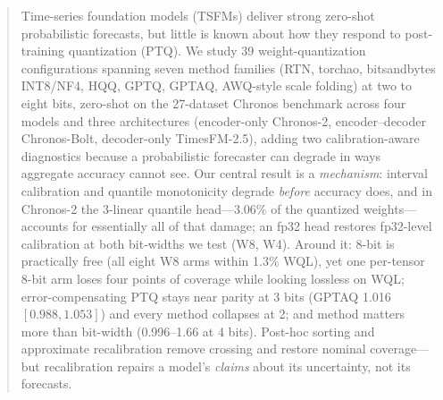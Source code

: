 \documentclass{article}
\begin{document}

\printAffiliationsAndNotice{}

\raggedbottom

\begin{abstract}
Time-series foundation models (TSFMs) deliver strong zero-shot probabilistic forecasts,
but little is known about how they respond to post-training quantization (PTQ). We study
39 weight-quantization configurations spanning seven method families (RTN, torchao,
bitsandbytes INT8/NF4, HQQ, GPTQ, GPTAQ, AWQ-style scale folding) at two to eight bits,
zero-shot on the 27-dataset Chronos benchmark across four models and three architectures
(encoder-only Chronos-2, encoder--decoder Chronos-Bolt, decoder-only TimesFM-2.5), adding
two calibration-aware diagnostics because a probabilistic forecaster can degrade in ways
aggregate accuracy cannot see. Our central result is a \emph{mechanism}: interval
calibration and quantile monotonicity degrade \emph{before} accuracy does, and in
Chronos-2 the 3-linear quantile head---3.06\% of the quantized weights---accounts for
essentially all of that damage; an fp32 head restores fp32-level calibration at both
bit-widths we test (W8, W4). Around it: 8-bit is practically free (all eight W8 arms
within 1.3\% WQL), yet one per-tensor 8-bit arm loses four points of coverage while
looking lossless on WQL; error-compensating PTQ stays near parity at 3 bits (GPTAQ 1.016
$[0.988,1.053]$) and every method collapses at 2; and method matters more than bit-width
(0.996--1.66 at 4 bits). Post-hoc sorting and approximate recalibration remove crossing
and restore nominal coverage---but recalibration repairs a model's \emph{claims} about
its uncertainty, not its forecasts.
\end{abstract}
\end{document}
